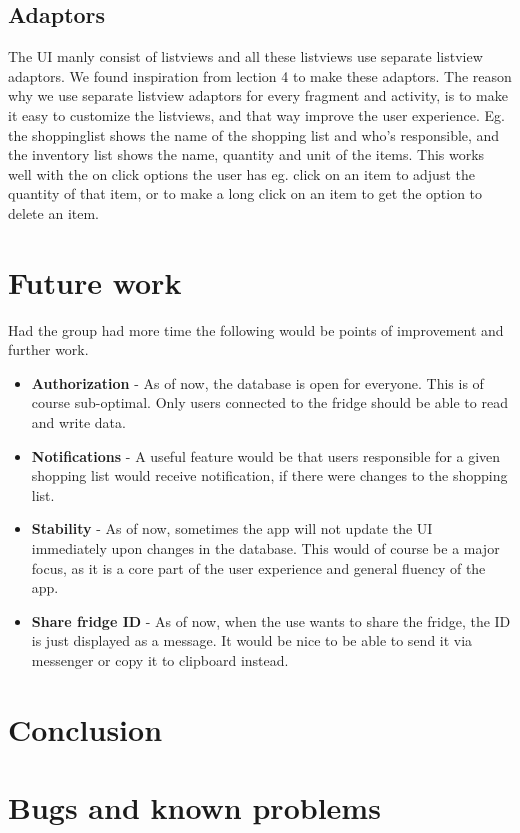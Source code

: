\documentclass[12pt]{article}
\begin{document}
\subsection{Adaptors}
The UI manly consist of listviews and all these listviews use separate listview adaptors. We found inspiration from lection 4 to make these adaptors. The reason why we use separate listview adaptors for every fragment and activity, is to make it easy to customize the listviews, and that way improve the user experience. Eg. the shoppinglist shows the name of the shopping list and who's responsible, and the inventory list shows the name, quantity and unit of the items. This works well with the on click options the user has eg. click on an item to adjust the quantity of that item, or to make a long click on an item to get the option to delete an item.

\section{Future work}
Had the group had more time the following would be points of improvement and further work.
\begin{itemize}
	\item \textbf{Authorization} - As of now, the database is open for everyone. This is of course sub-optimal. Only users connected to the fridge should be able to read and write data.
	\item \textbf{Notifications} - A useful feature would be that users responsible for a given shopping list would receive notification, if there were changes to the shopping list.
	\item \textbf{Stability} - As of now, sometimes the app will not update the UI immediately upon changes in the database. This would of course be a major focus, as it is a core part of the user experience and general fluency of the app.
	\item \textbf{Share fridge ID} - As of now, when the use wants to share the fridge, the ID is just displayed as a message. It would be nice to be able to send it via messenger or copy it to clipboard instead.
\end{itemize}

\section{Conclusion}


\section{Bugs and known problems}
\end{document}
